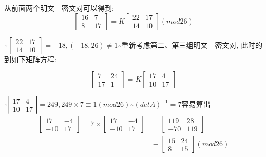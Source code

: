 \documentclass[UTF8]{ctexart}
\begin{document}
\begin{itemize}
\begin{enumerate}
\begin{itemize}
                从前面两个明文---密文对可以得到:
                $$\left[ \begin{array}{cc}{16} &{7}\\ {8} &{17} \end{array}\right]=K\left[ \begin{array}{cc}{22} &{17}\\ {14} &{10} \end{array}\right](mod 26)$$

                $
                    \because \left[ \begin{array}{cc}{22} &{17}\\ {14} &{10}\end{array}\right]=-18, (-18, 26)\neq 1
                    \therefore
                $重新考虑第二、第三组明文---密文对, 此时的到如下矩阵方程:

                $$\left[ \begin{array}{cc}{7} &{24}\\ {17} &{1} \end{array}\right]=K\left[ \begin{array}{cc}{17} &{4}\\ {10} &{17} \end{array}\right]$$

                $
                    \because \left| \begin{array}{cc}{17} &{4}\\ {10} &{17} \end{array}\right|=249, 249\times 7\equiv 1(mod 26)
                        \therefore (detA)^{-1}=7
                $容易算出
                $$
                \begin{aligned}
                    \left[ \begin{array}{cc}{17} &{-4}\\ {-10} &{17} \end{array}\right]=7\times \left[ \begin{array}{cc}{17} &{-4}\\ {-10} &{17} \end{array}\right]
                            &=\left[ \begin{array}{cc}{119} &{28}\\ {-70} &{119} \end{array}\right]\\
                                &\equiv \left[ \begin{array}{cc}{15} &{24}\\ {8} &{15} \end{array}\right](mod 26)
                \end{aligned}
                $$


\end{itemize}
\end{enumerate}
\end{itemize}
\end{document}
